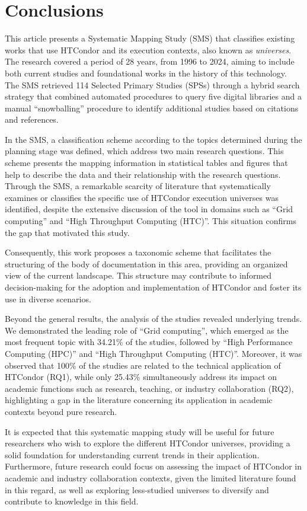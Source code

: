 \section{Conclusions}\label{sec:conclusiones}

This article presents a Systematic Mapping Study (SMS) that classifies existing works that use HTCondor and its execution contexts, also known as \textit{universes}. The research covered a period of 28 years, from 1996 to 2024, aiming to include both current studies and foundational works in the history of this technology. The SMS retrieved 114 Selected Primary Studies (SPSs) through a hybrid search strategy that combined automated procedures to query five digital libraries and a manual ``snowballing'' procedure to identify additional studies based on citations and references.

In the SMS, a classification scheme according to the topics determined during the planning stage was defined, which address two main research questions. This scheme presents the mapping information in statistical tables and figures that help to describe the data and their relationship with the research questions. Through the SMS, a remarkable scarcity of literature that systematically examines or classifies the specific use of HTCondor execution universes was identified, despite the extensive discussion of the tool in domains such as ``Grid computing'' and ``High Throughput Computing (HTC)''. This situation confirms the gap that motivated this study.

Consequently, this work proposes a taxonomic scheme that facilitates the structuring of the body of documentation in this area, providing an organized view of the current landscape. This structure may contribute to informed decision-making for the adoption and implementation of HTCondor and foster its use in diverse scenarios.

Beyond the general results, the analysis of the studies revealed underlying trends. We demonstrated the leading role of ``Grid computing'', which emerged as the most frequent topic with 34.21\% of the studies, followed by ``High Performance Computing (HPC)'' and ``High Throughput Computing (HTC)''. Moreover, it was observed that 100\% of the studies are related to the technical application of HTCondor (RQ1), while only 25.43\% simultaneously address its impact on academic functions such as research, teaching, or industry collaboration (RQ2), highlighting a gap in the literature concerning its application in academic contexts beyond pure research.

It is expected that this systematic mapping study will be useful for future researchers who wish to explore the different HTCondor universes, providing a solid foundation for understanding current trends in their application. Furthermore, future research could focus on assessing the impact of HTCondor in academic and industry collaboration contexts, given the limited literature found in this regard, as well as exploring less-studied universes to diversify and contribute to knowledge in this field.